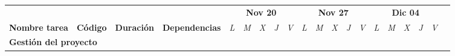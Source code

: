 \begin{longtable}[c]{llclllllllllllllllll}
        \multicolumn{1}{|c|}{}                                                                                                  & \multicolumn{1}{c|}{}                                                          & \multicolumn{1}{c|}{}                                                            & \multicolumn{1}{c|}{}                                                                & \multicolumn{5}{c|}{\textbf{Nov 20}}                                                                                                                                    & \multicolumn{5}{c|}{\textbf{Nov 27}}                                                                                                                                    & \multicolumn{5}{c|}{\textbf{Dic 04}}                                                                                                                                                  &  \\ \cline{5-19}
        \multicolumn{1}{|c|}{\multirow{-2}{*}{\textbf{Nombre tarea}}}                                                           & \multicolumn{1}{c|}{\multirow{-2}{*}{\textbf{Código}}}                         & \multicolumn{1}{c|}{\multirow{-2}{*}{\textbf{Duración}}}                         & \multicolumn{1}{c|}{\multirow{-2}{*}{\textbf{Dependencias}}}                         & \multicolumn{1}{l|}{\textit{L}} & \multicolumn{1}{l|}{\textit{M}} & \multicolumn{1}{l|}{\textit{X}} & \multicolumn{1}{l|}{\textit{J}} & \multicolumn{1}{l|}{\textit{V}} & \multicolumn{1}{l|}{\textit{L}} & \multicolumn{1}{l|}{\textit{M}} & \multicolumn{1}{l|}{\textit{X}} & \multicolumn{1}{l|}{\textit{J}} & \multicolumn{1}{l|}{\textit{V}} & \multicolumn{1}{l|}{\textit{L}} & \multicolumn{1}{l|}{\textit{M}} & \multicolumn{1}{l|}{\textit{X}} & \multicolumn{1}{l|}{\textit{J}} & \multicolumn{1}{l|}{\textit{V}}               &  \\ \cline{1-19}
        \multicolumn{4}{|l|}{\textbf{Gestión del proyecto}}                                                                                                                                                                                                                                                                                                                                & \multicolumn{15}{l|}{}                                                                                                                                                                                                                                                                                                                                                                                                                                                                                                                    &  \\ \cline{1-19}

\end{longtable}
